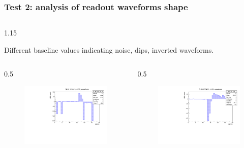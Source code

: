 \documentclass{beamer}
\begin{document}
 
\begin{frame}
    \frametitle{Test 2: analysis of readout waveforms shape}
    \vspace{-4mm}
    \begin{columns}
\begin{column}{1.15\framewidth}
    \setlength{\leftmargini}{1.2em}
 \begin{itemize}
{\small \item Different baseline values indicating noise, dips, inverted waveforms.}
  \end{itemize}
    \end{column}
    \end{columns}
        \vspace{-3mm}
    \begin{columns}
\begin{column}{0.5\framewidth}
         \begin{figure}[!h]
      \centering
      \hspace*{-2em}
      \includegraphics[width=\columnwidth]{figures/pdf/wf_ch58_1.pdf}
     \label{fig:normalhits}
\end{figure}
\end{column}
\begin{column}{0.5\framewidth}
      \begin{figure}[!h]
      \centering
            \hspace*{-1em}
\includegraphics[width=\columnwidth]{figures/pdf/wf_ch50_1.pdf}

\end{figure}
\end{column}
\end{columns}
\end{frame}
\end{document}
